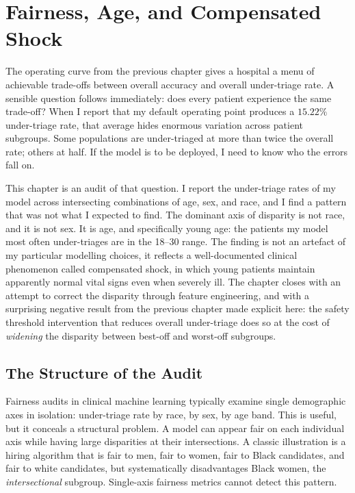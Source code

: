
\chapter{Fairness, Age, and Compensated Shock}
\label{ch:fairness}

The operating curve from the previous chapter gives a hospital a menu of achievable trade-offs between overall accuracy and overall under-triage rate. A sensible question follows immediately: does every patient experience the same trade-off? When I report that my default operating point produces a $15.22\%$ under-triage rate, that average hides enormous variation across patient subgroups. Some populations are under-triaged at more than twice the overall rate; others at half. If the model is to be deployed, I need to know who the errors fall on.

This chapter is an audit of that question. I report the under-triage rates of my model across intersecting combinations of age, sex, and race, and I find a pattern that was not what I expected to find. The dominant axis of disparity is not race, and it is not sex. It is age, and specifically young age: the patients my model most often under-triages are in the 18--30 range. The finding is not an artefact of my particular modelling choices, it reflects a well-documented clinical phenomenon called compensated shock, in which young patients maintain apparently normal vital signs even when severely ill. The chapter closes with an attempt to correct the disparity through feature engineering, and with a surprising negative result from the previous chapter made explicit here: the safety threshold intervention that reduces overall under-triage does so at the cost of \emph{widening} the disparity between best-off and worst-off subgroups.

\section{The Structure of the Audit}

Fairness audits in clinical machine learning typically examine single demographic axes in isolation: under-triage rate by race, by sex, by age band. This is useful, but it conceals a structural problem. A model can appear fair on each individual axis while having large disparities at their intersections. A classic illustration is a hiring algorithm that is fair to men, fair to women, fair to Black candidates, and fair to white candidates, but systematically disadvantages Black women, the \emph{intersectional} subgroup. Single-axis fairness metrics cannot detect this pattern.

